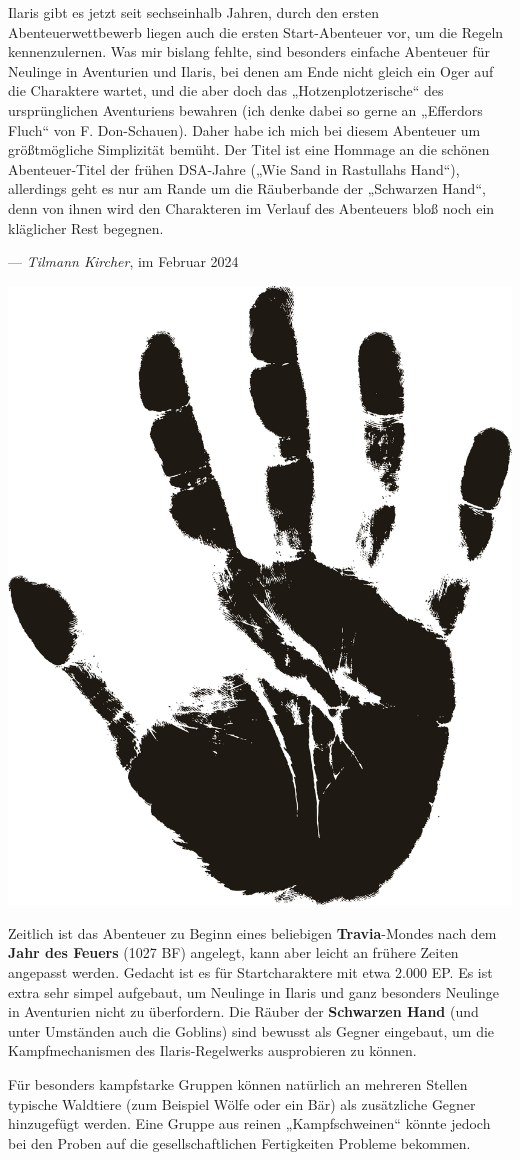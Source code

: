 \spaltenanfang

Ilaris gibt es jetzt seit sechseinhalb Jahren, durch den ersten Abenteuerwettbewerb
liegen auch die ersten Start-Abenteuer vor, um die Regeln kennenzulernen. Was mir 
bislang fehlte, sind besonders einfache Abenteuer für Neulinge in Aventurien und Ilaris, 
bei denen am Ende nicht gleich ein Oger auf die Charaktere wartet, und die aber doch das 
„Hotzenplotzerische“ des ursprünglichen Aventuriens bewahren (ich denke dabei so gerne an
„Efferdors Fluch“ von F. Don-Schauen). Daher habe ich mich bei diesem Abenteuer um
größtmögliche Simplizität bemüht. Der Titel ist eine Hommage an die schönen Abenteuer-Titel 
der frühen DSA-Jahre („Wie Sand in Rastullahs Hand“), allerdings geht es nur am Rande um die 
Räuberbande der „Schwarzen Hand“, denn von ihnen wird den Charakteren im Verlauf des Abenteuers 
bloß noch ein kläglicher Rest begegnen.
\begin{flushright}
--- \textit{Tilmann Kircher}, im Februar 2024
\end{flushright}
\vfill
\begin{center}
\includegraphics[width=0.4\linewidth]{offene_lizenz/hand}
\end{center}

Zeitlich ist das Abenteuer zu Beginn eines beliebigen \textbf{Travia}-Mondes nach dem \textbf{Jahr des Feuers} (1027 BF)
angelegt, kann aber leicht an frühere Zeiten angepasst werden. 
Gedacht ist es für Startcharaktere mit etwa 2.000 EP. 
Es ist extra sehr simpel aufgebaut, um Neulinge in Ilaris und ganz besonders Neulinge in Aventurien 
nicht zu überfordern. Die Räuber der \textbf{Schwarzen Hand} (und unter Umständen auch die Goblins) sind  bewusst als 
Gegner eingebaut, um die Kampfmechanismen des Ilaris-Regelwerks ausprobieren zu können. 

Für besonders kampfstarke Gruppen können natürlich an mehreren Stellen typische Waldtiere 
(zum Beispiel Wölfe oder ein Bär) als zusätzliche Gegner hinzugefügt werden. Eine Gruppe aus reinen 
„Kampfschweinen“ könnte jedoch bei den Proben auf die gesellschaftlichen Fertigkeiten Probleme bekommen.

